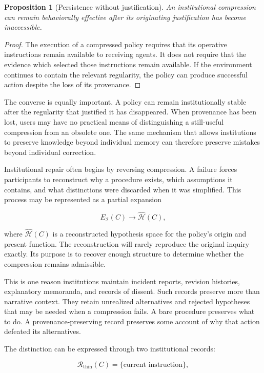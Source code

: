 \documentclass[11pt]{article}
\newtheorem{proposition}{Proposition}[section]
\begin{document}
\begin{proposition}[Persistence without justification]
An institutional compression can remain behaviorally effective after its originating justification has become inaccessible.
\end{proposition}

\begin{proof}
The execution of a compressed policy requires that its operative instructions remain available to receiving agents. It does not require that the evidence which selected those instructions remain available. If the environment continues to contain the relevant regularity, the policy can produce successful action despite the loss of its provenance.
\end{proof}

The converse is equally important. A policy can remain institutionally stable after the regularity that justified it has disappeared. When provenance has been lost, users may have no practical means of distinguishing a still-useful compression from an obsolete one. The same mechanism that allows institutions to preserve knowledge beyond individual memory can therefore preserve mistakes beyond individual correction.

Institutional repair often begins by reversing compression. A failure forces participants to reconstruct why a procedure exists, which assumptions it contains, and what distinctions were discarded when it was simplified. This process may be represented as a partial expansion

\[
E_{\mathcal{I}}(C)
\longrightarrow
\widehat{\mathcal{H}}(C),
\]

where $\widehat{\mathcal{H}}(C)$ is a reconstructed hypothesis space for the policy's origin and present function. The reconstruction will rarely reproduce the original inquiry exactly. Its purpose is to recover enough structure to determine whether the compression remains admissible.

This is one reason institutions maintain incident reports, revision histories, explanatory memoranda, and records of dissent. Such records preserve more than narrative context. They retain unrealized alternatives and rejected hypotheses that may be needed when a compression fails. A bare procedure preserves what to do. A provenance-preserving record preserves some account of why that action defeated its alternatives.

The distinction can be expressed through two institutional records:

\[
\mathcal{R}_{\mathrm{thin}}(C)
=
\{\text{current instruction}\},
\]
\end{document}
